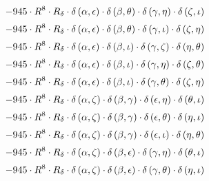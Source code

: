 \begin{subequations}
\begin{gather}
 \\[0.2em] \notag 		 - 945 \cdot R^{8} \cdot R_{\delta{}} \cdot \delta{}\left(\alpha{}, \epsilon{}\right) \cdot \delta{}\left(\beta{}, \theta{}\right) \cdot \delta{}\left(\gamma{}, \eta{}\right) \cdot \delta{}\left(\zeta{}, \iota{}\right) 
 \\[0.2em] \notag 		 - 945 \cdot R^{8} \cdot R_{\delta{}} \cdot \delta{}\left(\alpha{}, \epsilon{}\right) \cdot \delta{}\left(\beta{}, \theta{}\right) \cdot \delta{}\left(\gamma{}, \iota{}\right) \cdot \delta{}\left(\zeta{}, \eta{}\right) 
 \\[0.2em] \notag 		 - 945 \cdot R^{8} \cdot R_{\delta{}} \cdot \delta{}\left(\alpha{}, \epsilon{}\right) \cdot \delta{}\left(\beta{}, \iota{}\right) \cdot \delta{}\left(\gamma{}, \zeta{}\right) \cdot \delta{}\left(\eta{}, \theta{}\right) 
 \\[0.2em] \notag 		 - 945 \cdot R^{8} \cdot R_{\delta{}} \cdot \delta{}\left(\alpha{}, \epsilon{}\right) \cdot \delta{}\left(\beta{}, \iota{}\right) \cdot \delta{}\left(\gamma{}, \eta{}\right) \cdot \delta{}\left(\zeta{}, \theta{}\right) 
 \\[0.2em] \notag 		 - 945 \cdot R^{8} \cdot R_{\delta{}} \cdot \delta{}\left(\alpha{}, \epsilon{}\right) \cdot \delta{}\left(\beta{}, \iota{}\right) \cdot \delta{}\left(\gamma{}, \theta{}\right) \cdot \delta{}\left(\zeta{}, \eta{}\right) 
 \\[0.2em] \notag 		 - 945 \cdot R^{8} \cdot R_{\delta{}} \cdot \delta{}\left(\alpha{}, \zeta{}\right) \cdot \delta{}\left(\beta{}, \gamma{}\right) \cdot \delta{}\left(\epsilon{}, \eta{}\right) \cdot \delta{}\left(\theta{}, \iota{}\right) 
 \\[0.2em] \notag 		 - 945 \cdot R^{8} \cdot R_{\delta{}} \cdot \delta{}\left(\alpha{}, \zeta{}\right) \cdot \delta{}\left(\beta{}, \gamma{}\right) \cdot \delta{}\left(\epsilon{}, \theta{}\right) \cdot \delta{}\left(\eta{}, \iota{}\right) 
 \\[0.2em] \notag 		 - 945 \cdot R^{8} \cdot R_{\delta{}} \cdot \delta{}\left(\alpha{}, \zeta{}\right) \cdot \delta{}\left(\beta{}, \gamma{}\right) \cdot \delta{}\left(\epsilon{}, \iota{}\right) \cdot \delta{}\left(\eta{}, \theta{}\right) 
 \\[0.2em] \notag 		 - 945 \cdot R^{8} \cdot R_{\delta{}} \cdot \delta{}\left(\alpha{}, \zeta{}\right) \cdot \delta{}\left(\beta{}, \epsilon{}\right) \cdot \delta{}\left(\gamma{}, \eta{}\right) \cdot \delta{}\left(\theta{}, \iota{}\right) 
 \\[0.2em] \notag 		 - 945 \cdot R^{8} \cdot R_{\delta{}} \cdot \delta{}\left(\alpha{}, \zeta{}\right) \cdot \delta{}\left(\beta{}, \epsilon{}\right) \cdot \delta{}\left(\gamma{}, \theta{}\right) \cdot \delta{}\left(\eta{}, \iota{}\right) 

\end{gather}
\end{subequations}
